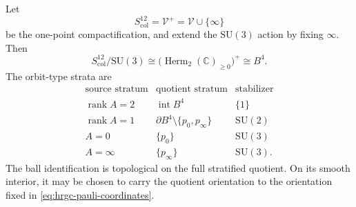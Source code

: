 \begin{theorem}
\label{thm:hrgc-s12-ball-quotient}
Let
\[
 S^{12}_{\mathrm{col}}=\mathscr V^+=\mathscr V\cup\{\infty\}
\]
be the one-point compactification, and extend the \(\mathrm{SU}(3)\) action
by fixing \(\infty\).  Then
\begin{equation}
 S^{12}_{\mathrm{col}}/\mathrm{SU}(3)
 \cong
 \bigl(\operatorname{Herm}_2(\mathbb C)_{\geq0}\bigr)^+
 \cong B^4.
 \label{eq:hrgc-s12-ball}
\end{equation}
The orbit-type strata are
\begin{equation}
 \begin{array}{c|c|c}
 \text{source stratum}&\text{quotient stratum}&\text{stabilizer}\\ \hline
 \operatorname{rank}A=2&\operatorname{int}B^4&\{1\}\\
 \operatorname{rank}A=1&\partial B^4\setminus\{p_0,p_\infty\}&
   \mathrm{SU}(2)\\
 A=0&\{p_0\}&\mathrm{SU}(3)\\
 A=\infty&\{p_\infty\}&\mathrm{SU}(3).
 \end{array}
 \label{eq:hrgc-compact-strata}
\end{equation}
The ball identification is topological on the full stratified quotient.  On
its smooth interior, it may be chosen to carry the quotient orientation to
the orientation fixed in \eqref{eq:hrgc-pauli-coordinates}.
\end{theorem}

